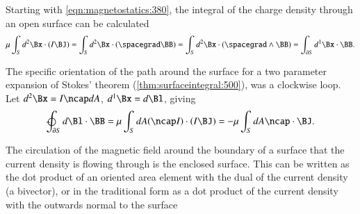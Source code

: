 %
%


Starting with
\cref{eqn:magnetostatics:380}, the
integral of the
charge density through an open surface can be calculated
\begin{dmath}\label{eqn:magnetostatics_enclosedCurrent:720}
\mu \int_S d^2 \Bx \cdot (I \BJ)
=
\int_S d^2 \Bx \cdot (\spacegrad \BB)
=
\int_S d^2 \Bx \cdot (\spacegrad \wedge \BB)
=
\int_{\partial S} d^1 \Bx \cdot \BB.
\end{dmath}

The specific orientation of the path around the surface for a two parameter expansion of Stokes' theorem 
(\cref{thm:surfaceintegral:500}),
was a clockwise loop.
Let
\( d^2 \Bx = I \ncap dA \), \( d^1 \Bx = d\Bl \), giving
\begin{dmath}\label{eqn:magnetostatics_enclosedCurrent:740}
\ointclockwise_{\partial S} d\Bl \cdot \BB
= \mu \int_S dA (\ncap I) \cdot (I \BJ)
= -\mu \int_S dA \ncap \cdot \BJ.
\end{dmath}

The circulation of the magnetic field around the boundary of a surface that the current density is flowing through is the enclosed surface.
This can be written as the dot product of an oriented area element with the dual of the current density (a bivector), or in the traditional form as a dot product of the current density with the outwards normal to the surface


